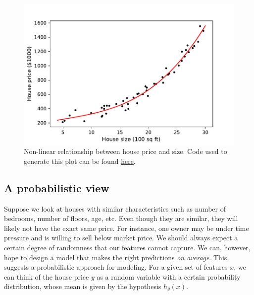 \documentclass{article}
\theoremstyle{definition}
\begin{document}
\begin{figure}[ht]
\centering
\includegraphics[scale=0.7]{images/lin_reg/poly-data.pdf}
\caption{Non-linear relationship between house price and size. Code used to generate this plot can be found \href{https://github.com/siavashaslanbeigi/ml_notes_supp/blob/master/lin_reg/poly.ipynb}{\color{blue} here}.}
\label{linreg-fig:poly-data}
\end{figure}

\subsection{A probabilistic view}
Suppose we look at houses with similar characteristics such as number of bedrooms, number of floors, age, etc. Even though they are similar, they will likely not have the exact same price. For instance, one owner may be under time pressure and is willing to sell below market price. We should always expect a certain degree of randomness that our features cannot capture. We can, however, hope to design a model that makes the right predictions \textit{on average}. This suggests a probabilistic approach for modeling. For a given set of features $x$, we can think of the house price $y$ as a random variable with a certain probability distribution, whose mean is given by the hypothesis $h_{\theta}(x)$.
\end{document}
